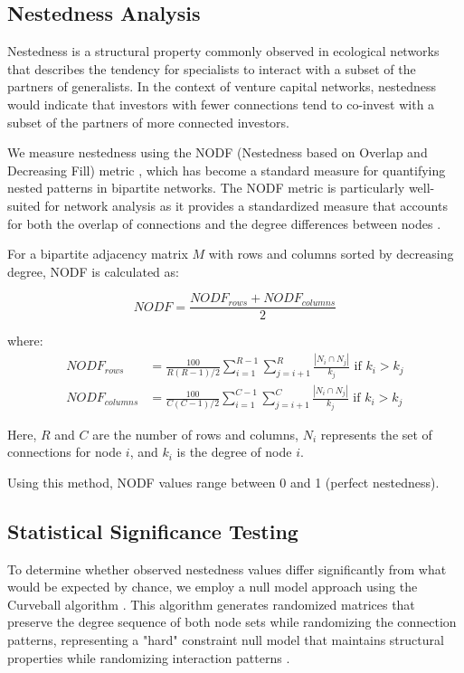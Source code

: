 \subsection{Nestedness Analysis}

Nestedness is a structural property commonly observed in ecological networks \cite{AlmeidaNeto2008} that describes the tendency for specialists to interact with a subset of the partners of generalists. In the context of venture capital networks, nestedness would indicate that investors with fewer connections tend to co-invest with a subset of the partners of more connected investors.

We measure nestedness using the NODF (Nestedness based on Overlap and Decreasing Fill) metric \cite{AlmeidaNeto2008}, which has become a standard measure for quantifying nested patterns in bipartite networks. The NODF metric is particularly well-suited for network analysis as it provides a standardized measure that accounts for both the overlap of connections and the degree differences between nodes \cite{Dormann2009}.

For a bipartite adjacency matrix $M$ with rows and columns sorted by decreasing degree, NODF is calculated as:

\begin{equation}
NODF = \frac{NODF_{rows} + NODF_{columns}}{2}
\end{equation}

where:
\begin{align}
NODF_{rows} &= \frac{100}{R(R-1)/2} \sum_{i=1}^{R-1} \sum_{j=i+1}^{R} \frac{|N_i \cap N_j|}{k_j} \text{ if } k_i > k_j \\
NODF_{columns} &= \frac{100}{C(C-1)/2} \sum_{i=1}^{C-1} \sum_{j=i+1}^{C} \frac{|N_i \cap N_j|}{k_j} \text{ if } k_i > k_j
\end{align}

Here, $R$ and $C$ are the number of rows and columns, $N_i$ represents the set of connections for node $i$, and $k_i$ is the degree of node $i$.

Using this method, NODF values range between 0 and 1 (perfect nestedness).

\subsection{Statistical Significance Testing}

To determine whether observed nestedness values differ significantly from what would be expected by chance, we employ a null model approach using the Curveball algorithm \cite{Strona2014}. This algorithm generates randomized matrices that preserve the degree sequence of both node sets while randomizing the connection patterns, representing a "hard" constraint null model that maintains structural properties while randomizing interaction patterns \cite{Dormann2009}.

